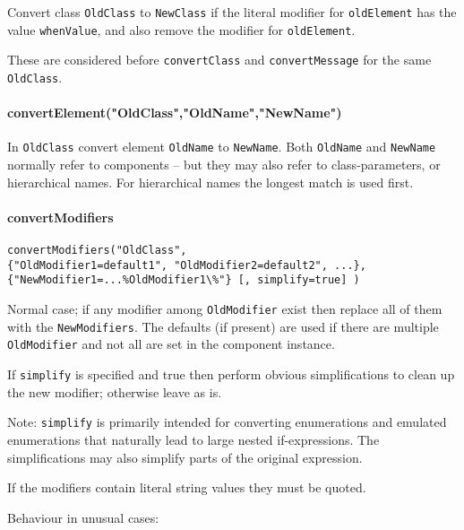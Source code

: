 Convert class \lstinline!OldClass! to \lstinline!NewClass! if the literal modifier for
\lstinline!oldElement! has the value \lstinline!whenValue!, and also remove the modifier for
\lstinline!oldElement!.

These are considered before \lstinline!convertClass! and \lstinline!convertMessage! for the same
\lstinline!OldClass!.

\paragraph*{convertElement("OldClass","OldName","NewName")}

In \lstinline!OldClass! convert element \lstinline!OldName! to \lstinline!NewName!.
Both \lstinline!OldName! and \lstinline!NewName!
normally refer to components -- but they may also refer to
class-parameters, or hierarchical names. For hierarchical names the
longest match is used first.

\paragraph*{convertModifiers}

\begin{lstlisting}[language=modelica]
convertModifiers("OldClass",
{"OldModifier1=default1", "OldModifier2=default2", ...},
{"NewModifier1=...%OldModifier1\%"} [, simplify=true] )
\end{lstlisting}

Normal case; if any modifier among \lstinline!OldModifier! exist then replace all of
them with the \lstinline!NewModifiers!. The defaults (if present) are used if there
are multiple \lstinline!OldModifier! and not all are set in the component instance.

If \lstinline!simplify! is specified and true then perform obvious simplifications
to clean up the new modifier; otherwise leave as is.
\begin{nonnormative}
Note: \lstinline!simplify! is primarily intended for converting enumerations and emulated
enumerations that naturally lead to large nested if-expressions. The
simplifications may also simplify parts of the original expression.
\end{nonnormative}

If the modifiers contain literal string values they must be quoted.

Behaviour in unusual cases:

